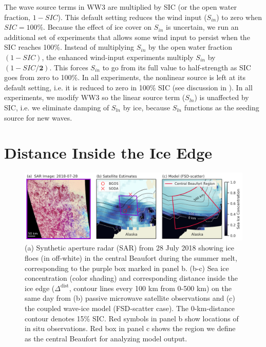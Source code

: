 \documentclass [11pt, proquest] {uwthesis}[2020/02/24]
\begin{document}
The wave source terms in WW3 are multiplied by SIC (or the open water fraction, $1-SIC$). This default setting reduces the wind input ($S_{in}$) to zero when $SIC=100\%$. Because the effect of ice cover on $S_{in}$ is uncertain, we run an additional set of experiments that allows some wind input to persist when the SIC reaches 100\%. Instead of multiplying $S_{in}$ by the open water fraction $(1-SIC)$, the enhanced wind-input experiments multiply $S_{in}$ by $(1-SIC\mathbf{/2})$. This forces $S_{in}$ to go from its full value to half-strength as SIC goes from zero to 100\%. In all experiments, the nonlinear source is left at its default setting, i.e. it is reduced to zero in 100\% SIC (see discussion in  \cite{Rogers2016DissipationSea}). In all experiments, we modify WW3 so the linear source term ($S_{ln}$) is unaffected by SIC, i.e. we eliminate damping of $S_{ln}$ by ice, because $S_{ln}$ functions as the seeding source for new waves.  

\section{Distance Inside the Ice Edge} \label{distance-method}

\begin{figure}
    \noindent\includegraphics[width=\textwidth]{distance_03.png}
    \caption{(a) Synthetic aperture radar (SAR) \cite{SentinelHubEOBrowser, RaspaudSAR-Ice:Composite} from 28 July 2018 showing ice floes (in off-white) in the central Beaufort during the summer melt, corresponding to the purple box marked in panel b. (b-c) Sea ice concentration (color shading) and corresponding distance inside the ice edge ($\Delta^{\mathrm{dist}}$, contour lines every 100 km from 0-500 km) on the same day from (b) passive microwave satellite observations and (c) the coupled wave-ice model (FSD-scatter case). The 0-km-distance contour denotes 15\% SIC. Red symbols in panel b show locations of in situ observations. Red box in panel c shows the region we define as the central Beaufort for analyzing model output.}
    \label{fig:distance}
\end{figure}
\end{document}
